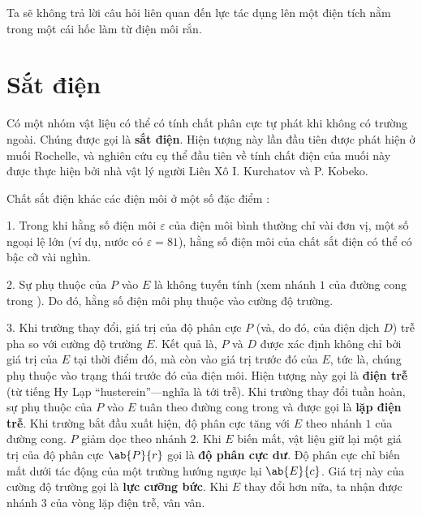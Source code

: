 Ta sẽ không trả lời câu hỏi liên quan đến lực tác dụng lên một điện tích nằm trong một cái hốc làm từ điện môi rắn.

\section{Sắt điện}\label{sec:2_9}

Có một nhóm vật liệu có thể có tính chất phân cực tự phát khi không có trường ngoài. Chúng được gọi là \textbf{sắt điện}. Hiện tượng này lần đầu tiên được phát hiện ở muối Rochelle, và nghiên cứu cụ thể đầu tiên về tính chất điện của muối này được thực hiện bởi nhà vật lý người Liên Xô I. Kurchatov và P. Kobeko.

Chất sắt điện khác các điện môi ở một số đặc điểm :

1. Trong khi hằng số điện môi $\varepsilon$ của điện môi bình thường chỉ vài đơn vị, một số ngoại lệ lớn (ví dụ, nước có $\varepsilon=81$), hằng số điện môi của chất sắt điện có thể có bậc cỡ vài nghìn.

2. Sự phụ thuộc của $P$ vào $E$ là không tuyến tính (xem nhánh $1$ của đường cong trong ). Do đó, hằng số điện môi phụ thuộc vào cường độ trường.

3. Khi trường thay đổi, giá trị của độ phân cực $P$ (và, do đó, của điện dịch $D$) trễ pha so với cường độ trường $E$. Kết quả là, $P$ và $D$ được xác định không chỉ bởi giá trị của $E$ tại thời điểm đó, mà còn vào giá trị trước đó của $E$, tức là, chúng phụ thuộc vào trạng thái trước đó của điện môi. Hiện tượng này gọi là \textbf{điện trễ} (từ tiếng Hy Lạp ``husterein''---nghĩa là tới trễ). Khi trường thay đổi tuần hoàn, sự phụ thuộc của $P$ vào $E$  tuân theo đường cong trong  và được gọi là  \textbf{lặp điện trễ}.
Khi trường bắt đầu xuất hiện, độ phân cực tăng với $E$ theo nhánh $1$ của đường cong. $P$ giảm dọc theo nhánh $2$. Khi $E$ biến mất, vật liệu giữ lại một giá trị của độ phân cực $\ab{P}{r}$ gọi là \textbf{độ phân cực dư}. Độ phân cực chỉ biến mất dưới tác động của một trường hướng ngược lại $\ab{E}{c}$. Giá trị này của cường độ trường gọi là \textbf{lực cưỡng bức}. Khi $E$ thay đổi hơn nữa, ta nhận được nhánh $3$ của vòng lặp điện trễ, vân vân.

